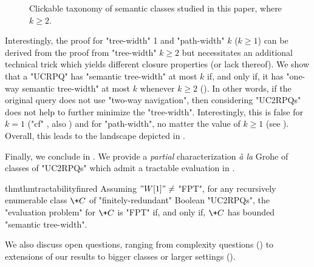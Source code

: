 \begin{figure}
{{
		}
	}
	\caption{
		\AP\label{fig:taxonomy-semantic}
		Clickable taxonomy of semantic classes studied in this paper, where $k \geq 2$.
	}
\end{figure}
Interestingly, the proof for "tree-width" 1 and "path-width" $k$ ($k \geq 1$)
can be derived from the proof from "tree-width" $k\geq 2$ but necessitates an
additional technical trick which yields different closure properties (or lack thereof).
We show that a "UCRPQ" has "semantic tree-width" at most $k$ if, and only if, it
has "one-way semantic tree-width" at most $k$ whenever $k \geq 2$
(). In other words, if the original query does not
use "two-way navigation", then considering "UC2RPQs" does not help to further minimize the "tree-width". Interestingly, this is false for $k=1$ ("cf" ,
also \cite[Proposition 6.4]{BarceloRV16}) and for "path-width", no matter the value of $k\geq 1$ (see ). Overall, this leads to
the landscape depicted in .

Finally, we conclude in .
We provide a \emph{partial} characterization \emph{à la} Grohe of classes of "UC2RPQs" which admit a tractable evaluation in .
\begin{restatable*}{thm}{thmtractabilityfinred}
    \AP\label{thm:tractability-finred}
    Assuming $"W[1]" \neq $ "FPT", for any recursively enumerable class $\+C$ of "finitely-redundant" Boolean "UC2RPQs", the "evaluation problem" for $\+C$ is "FPT" if, and only if, $\+C$ has bounded "semantic tree-width".
\end{restatable*}
We also discuss open questions, ranging from complexity
questions () to extensions of our results to bigger classes
or larger settings ().


